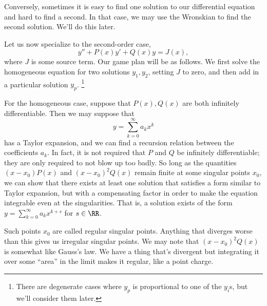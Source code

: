 Conversely, sometimes it is easy to find one solution to our differential equation and hard to find a second. In that case, we may use the Wronskian to find the second solution. We'll do this later.

Let us now specialize to the second-order case,
\begin{equation}
    y'' + P(x) y' + Q(x) y = J(x),
\end{equation}
where $J$ is some source term. Our game plan will be as follows. We first solve the homogeneous equation for two solutions $y_1,y_2$, setting $J$ to zero, and then add in a particular solution $y_p$.%
    \footnote{There are degenerate cases where $y_p$ is proportional to one of the $y_i$s, but we'll consider them later.}

For the homogeneous case, suppose that $P(x),Q(x)$ are both infinitely differentiable. Then we may suppose that
\begin{equation}
    y=\sum_{k=0}^\infty a_k x^k
\end{equation}
has a Taylor expansion, and we can find a recursion relation between the coefficients $a_k$. In fact, it is not required that $P$ and $Q$ be infinitely differentiable; they are only required to not blow up too badly. So long as the quantities $(x-x_0) P(x)$ and $(x-x_0)^2 Q(x)$ remain finite at some singular points $x_0$, we can show that there exists at least one solution that satisfies a form similar to Taylor expansion, but with a compensating factor in order to make the equation integrable even at the singularities. That is, a solution exists of the form $y=\sum_{k=0}^\infty a_k x^{k+s}$ for $s\in \RR$.

Such points $x_0$ are called regular singular points. Anything that diverges worse than this gives us irregular singular points. We may note that $(x-x_0)^2 Q(x)$ is somewhat like Gauss's law. We have a thing that's divergent but integrating it over some ``area'' in the limit makes it regular, like a point charge.